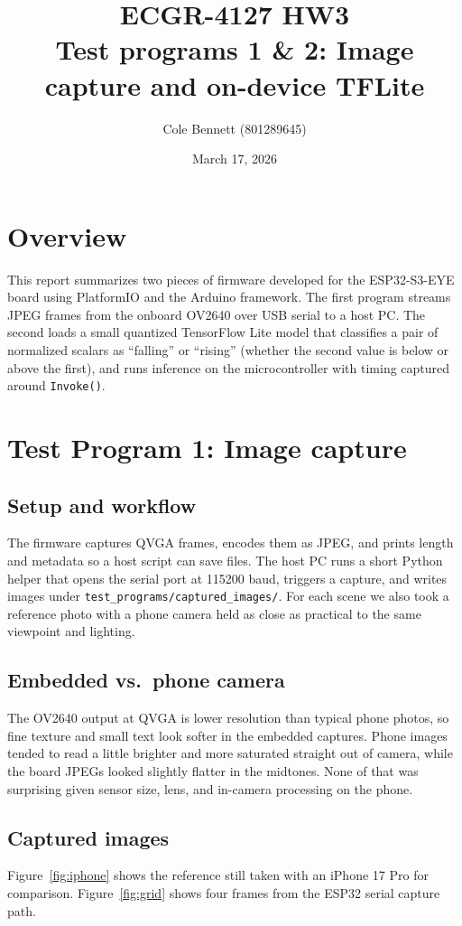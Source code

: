 \documentclass[11pt]{article}
\title{ECGR-4127 HW3\\[0.4em]\large Test programs 1 \& 2: Image capture and on-device TFLite}
\author{Cole Bennett (801289645)}
\date{March 17, 2026}
\begin{document}
\maketitle

\section{Overview}
This report summarizes two pieces of firmware developed for the ESP32-S3-EYE board using PlatformIO and the Arduino framework. The first program streams JPEG frames from the onboard OV2640 over USB serial to a host PC. The second loads a small quantized TensorFlow Lite model that classifies a pair of normalized scalars as ``falling'' or ``rising'' (whether the second value is below or above the first), and runs inference on the microcontroller with timing captured around \texttt{Invoke()}.

\section{Test Program 1: Image capture}

\subsection{Setup and workflow}
The firmware captures QVGA frames, encodes them as JPEG, and prints length and metadata so a host script can save files. The host PC runs a short Python helper that opens the serial port at 115200 baud, triggers a capture, and writes images under \texttt{test\_programs/captured\_images/}. For each scene we also took a reference photo with a phone camera held as close as practical to the same viewpoint and lighting.

\subsection{Embedded vs.\ phone camera}
The OV2640 output at QVGA is lower resolution than typical phone photos, so fine texture and small text look softer in the embedded captures. Phone images tended to read a little brighter and more saturated straight out of camera, while the board JPEGs looked slightly flatter in the midtones. None of that was surprising given sensor size, lens, and in-camera processing on the phone.

\subsection{Captured images}
Figure~\ref{fig:iphone} shows the reference still taken with an iPhone 17 Pro for comparison. Figure~\ref{fig:grid} shows four frames from the ESP32 serial capture path.
\end{document}
